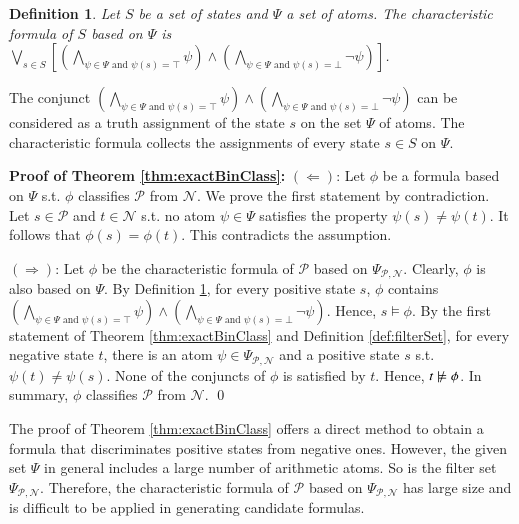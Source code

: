 \documentclass[review]{elsarticle}
\newcommand{\nmodels}{\mathrel{\ooalign{$\models$\cr\hfil$/$\hfil\cr}}}
\newcommand{\true}{\top}
\newcommand{\false}{\bot}
\newcommand{\positiveSet}{\mathcal{P}}
\newcommand{\negativeSet}{\mathcal{N}}
\newcommand{\featureSet}{\Psi}
\newtheorem{definition}{Definition}
\begin{document}
	\begin{definition}\label{def:charForm} \rm
		Let $S$ be a set of states and $\featureSet$ a set of atoms.
		The \textit{characteristic formula} of $S$ based on $\featureSet$ is $\bigvee_{s \in S} \left[\left(\bigwedge_{\psi \in \featureSet \text{ and } \psi(s) = \true} \psi\right) \land \left(\bigwedge_{\psi \in \featureSet \text{ and } \psi(s) = \false} \neg \psi\right) \right]$.
	\end{definition}
	
	The conjunct $\left(\bigwedge_{\psi \in \featureSet \text{ and } \psi(s) = \true} \psi\right) \land \left(\bigwedge_{\psi \in \featureSet \text{ and } \psi(s) = \false} \neg \psi\right)$ can be considered as a truth assignment of the state $s$ on the set $\featureSet$ of atoms.
	The characteristic formula collects the assignments of every state $s \in S$ on $\featureSet$.
	
	
	{\bf Proof of Theorem \ref{thm:exactBinClass}: }
		$(\Leftarrow)$:
		Let $\phi$ be a formula based on $\featureSet$ s.t. $\phi$ classifies $\positiveSet$ from $\negativeSet$. 			
		We prove the first statement by	contradiction.
		Let $s \in \positiveSet$ and $t \in \negativeSet$ s.t. no atom $\psi \in \featureSet$ satisfies the property $\psi(s) \neq \psi(t)$.
		It follows that $\phi(s) = \phi(t)$.
		This contradicts the assumption.   			
		
		$(\Rightarrow)$: 
		Let $\phi$ be the characteristic formula of $\positiveSet$ based on $\featureSet_{\positiveSet, \negativeSet}$.
		Clearly, $\phi$ is also based on $\featureSet$.
		By Definition \ref{def:charForm}, for every positive state $s$, $\phi$ contains $\left(\bigwedge_{\psi \in \featureSet \text{ and } \psi(s) = \true} \psi\right) \land \left(\bigwedge_{\psi \in \featureSet \text{ and } \psi(s) = \false} \neg \psi\right)$.
		Hence, $s \models \phi$.
		By the first statement of Theorem \ref{thm:exactBinClass} and Definition \ref{def:filterSet}, for every negative state $t$, there is an atom $\psi \in \featureSet_{\positiveSet, \negativeSet}$ and a positive state $s$ s.t. $\psi(t) \neq \psi(s)$.
		None of the conjuncts of $\phi$ is satisfied by $t$.
		Hence, $t \nmodels \phi$.
		In summary, $\phi$ classifies $\positiveSet$ from $\negativeSet$. \qed

	The proof of Theorem \ref{thm:exactBinClass} offers a direct method to obtain a formula that discriminates positive states from negative ones.
	However, the given set $\featureSet$ in general includes a large number of arithmetic atoms.
	So is the filter set $\featureSet_{\positiveSet, \negativeSet}$.
	Therefore, the characteristic formula of $\positiveSet$ based on $\featureSet_{\positiveSet, \negativeSet}$ has large size and is difficult to be applied in generating candidate formulas.
		
\end{document}
